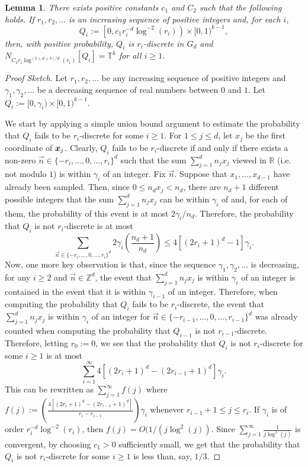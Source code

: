 \documentclass[12pt,a4paper]{amsart}
\numberwithin{equation}{section}
\newtheorem{lemma}[equation]{Lemma}
\theoremstyle{definition}
\begin{document}
\begin{lemma}
\label{lem:stripLem}
There exists positive constants $c_1$ and $C_2$ such that the following holds. If $r_1,r_2,\dots$ is an increasing sequence of positive integers and, for each $i$,  
\[Q_i:=\left[0, c_1r_i^{-d}\log^{-2}(r_i)\right)\times [0,1)^{k-1},\]
then, with positive probability, $Q_i$ is $r_i$-discrete in $G_d$ and $N_{C_2r_i\log^{(k+d+3)/d}(r_i)}[Q_{i}]=\mathbb{T}^k$ for all $i\geq1$.
\end{lemma}

\begin{proof}[Proof Sketch]
Let $r_1,r_2,\dots$ be any increasing sequence of positive integers and $\gamma_1,\gamma_2,\dots$ be a decreasing sequence of real numbers between $0$ and $1$. Let $Q_i:=[0,\gamma_i)\times [0,1)^{k-1}$. 

We start by applying a simple union bound argument to estimate the probability that $Q_i$ fails to be $r_i$-discrete for some $i\geq1$. For $1\leq j\leq d$, let $x_j$ be the first coordinate of $\boldsymbol{x}_j$. Clearly, $Q_i$ fails to be $r_i$-discrete if and only if there exists a non-zero $\vec{n}\in\{-r_i,\dots,0,\dots,r_i\}^d$ such that the sum $\sum_{j=1}^dn_j x_j$ viewed in $\mathbb{R}$ (i.e. not modulo $1$) is within $\gamma_i$ of an integer. Fix $\vec{n}$. Suppose that $x_1,\dots,x_{d-1}$ have already been sampled. Then, since $0\leq n_dx_j<n_d$, there are $n_d+1$ different possible integers that the sum $\sum_{j=1}^dn_j x_j$ can be within $\gamma_i$ of and, for each of them, the probability of this event is at most $2\gamma_i/n_d$. Therefore, the probability that $Q_i$ is not $r_i$-discrete is at most
\[\sum_{\vec{n}\in\{-r_i,\dots,0,\dots,r_i\}^d}2\gamma_i\left(\frac{n_d+1}{n_d}\right) \leq 4\left[(2r_i+1)^d-1\right]\gamma_i.\]
Now, one more key observation is that, since the sequence $\gamma_1,\gamma_2,\dots$ is decreasing, for any $i\geq2$ and $\vec{n}\in \mathbb{Z}^d$, the event that $\sum_{j=1}^dn_j x_j$ is within $\gamma_i$ of an integer is contained in the event that it is within $\gamma_{i-1}$ of an integer. Therefore, when computing the probability that $Q_i$ fails to be $r_i$-discrete, the event that $\sum_{j=1}^dn_jx_j$ is within $\gamma_i$ of an integer for $\vec{n}\in\{-r_{i-1},\dots,0,\dots,r_{i-1}\}^d$ was already counted when computing the probability that $Q_{i-1}$ is not $r_{i-1}$-discrete. Therefore, letting $r_0:=0$, we see that the probability that $Q_i$ is not $r_i$-discrete for some $i\geq1$ is at most
\[\sum_{i=1}^\infty 4\left[(2r_i+1)^d - (2r_{i-1}+1)^d\right]\gamma_i.\]
This can be rewritten as $\sum_{j=1}^\infty f(j)$ where  $f(j):=\left(\frac{4\left[(2r_i+1)^d - (2r_{i-1}+1)^d\right]}{r_i-r_{i-1}}\right)\gamma_i$ whenever $r_{i-1}+1\leq j\leq r_i$. If $\gamma_i$ is of order $r_i^{-d}\log^{-2}(r_i)$, then $f(j)=O(1/(j\log^2(j))$. Since $\sum_{j=1}^\infty \frac{1}{j\log^2(j)}$ is convergent, by choosing $c_1>0$ sufficiently small, we get that the probability that $Q_i$ is not $r_i$-discrete for some $i\geq1$ is less than, say, $1/3$. 


\end{proof}
\end{document}
